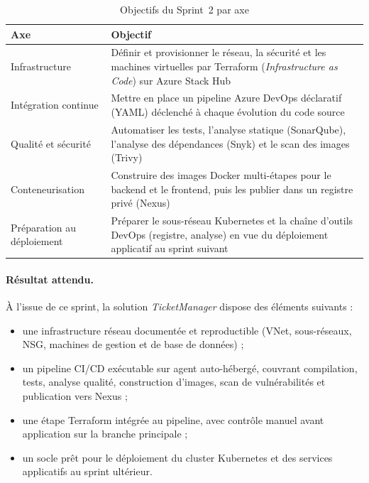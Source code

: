 \begin{table}[H]
\centering
\footnotesize
\renewcommand{\arraystretch}{1.1}
\setlength{\tabcolsep}{6pt}
\begin{tabular}{|p{2.8cm}|p{9.2cm}|}
\hline
\textbf{Axe} & \textbf{Objectif} \\
\hline
Infrastructure & Définir et provisionner le réseau, la sécurité et les machines virtuelles
                 par Terraform (\textit{Infrastructure as Code}) sur Azure Stack Hub \\
\hline
Intégration continue & Mettre en place un pipeline Azure DevOps déclaratif (YAML) déclenché
                       à chaque évolution du code source \\
\hline
Qualité et sécurité & Automatiser les tests, l'analyse statique (SonarQube), l'analyse des
                      dépendances (Snyk) et le scan des images (Trivy) \\
\hline
Conteneurisation & Construire des images Docker multi-étapes pour le backend et le frontend,
                   puis les publier dans un registre privé (Nexus) \\
\hline
Préparation au déploiement & Préparer le sous-réseau Kubernetes et la chaîne d'outils DevOps
                             (registre, analyse) en vue du déploiement applicatif au sprint suivant \\
\hline
\end{tabular}
\caption{Objectifs du Sprint~2 par axe}
\label{tab:s2-objectifs}
\end{table}

\paragraph{Résultat attendu.}
À l'issue de ce sprint, la solution \textit{TicketManager} dispose des éléments suivants :
\begin{itemize}
  \item une infrastructure réseau documentée et reproductible (VNet, sous-réseaux, NSG,
        machines de gestion et de base de données) ;
  \item un pipeline CI/CD exécutable sur agent auto-hébergé, couvrant compilation, tests,
        analyse qualité, construction d'images, scan de vulnérabilités et publication vers Nexus ;
  \item une étape Terraform intégrée au pipeline, avec contrôle manuel avant application sur
        la branche principale ;
  \item un socle prêt pour le déploiement du cluster Kubernetes et des services applicatifs
        au sprint ultérieur.
\end{itemize}

